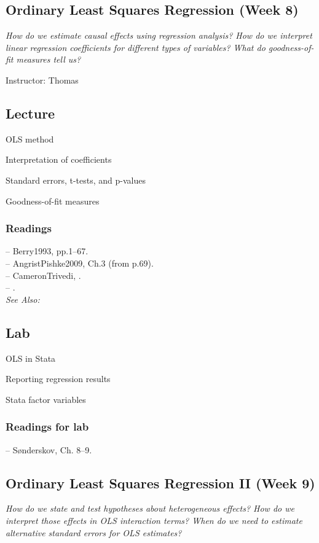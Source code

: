 \documentclass[11pt,a4paper]{article}
\newcommand{\reading}[2][]{\noindent -- {#1}\bibentry{#2}.\vspace{.25em}\\}
\newcommand{\textbook}[2][]{\noindent -- {#2}, {#1}.\vspace{.25em}\\}
\newcommand{\thomas}{\vspace{1em}\noindent Instructor: Thomas\vspace{1em}\\}
\newcommand{\seealso}{\noindent \emph{See Also:}\\}
\begin{document}
\clearpage
\subsection{Ordinary Least Squares Regression (Week 8)}
\emph{How do we estimate causal effects using regression analysis? How do we interpret linear regression coefficients for different types of variables? What do goodness-of-fit measures tell us?}

\thomas

\subsection*{Lecture}

\begin{itemize*}
\item OLS method
\item Interpretation of coefficients
\item Standard errors, t-tests, and p-values
\item Goodness-of-fit measures
\end{itemize*}

\subsubsection*{Readings}
\textbook[pp.1--67]{Berry1993}
\textbook[Ch.3 (from p.69)]{AngristPishke2009}
\textbook{CameronTrivedi}
\reading{Englebert2000}


\seealso

\subsection*{Lab}
\begin{itemize*}
\item OLS in Stata
\item Reporting regression results
\item Stata factor variables
\end{itemize*}


\subsubsection*{Readings for lab}
\textbook[Ch. 8--9]{S{\o}nderskov}




\clearpage
\subsection{Ordinary Least Squares Regression II (Week 9)}
\emph{How do we state and test hypotheses about heterogeneous effects? How do we interpret those effects in OLS interaction terms? When do we need to estimate alternative standard errors for OLS estimates?}
\end{document}
